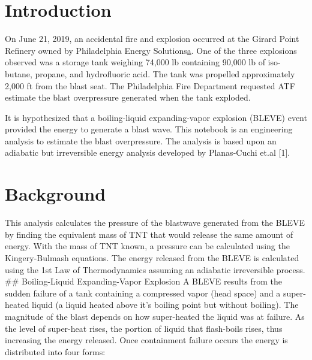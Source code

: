 \documentclass[10pt,parskip=half,
toc=sectionentrywithdots,
bibliography=totocnumbered,
captions=tableheading,numbers=noendperiod]{scrartcl}
\begin{document}
    \begingroup
    \let\cleardoublepage\relax
    \let\clearpage\relax\tableofcontents\listoffigures\listoftables{}
    \endgroup

\hypertarget{introduction}{%
\section{Introduction}\label{introduction}}

On June 21, 2019, an accidental fire and explosion occurred at the
Girard Point Refinery owned by Philadelphia Energy
Solutions\href{https://6abc.com/hydrocarbon-vapors-identified-as-cause-of-philly-refinery-fire/5368469/}{a}.
One of the three explosions observed was a storage tank weighing 74,000
lb containing 90,000 lb of iso-butane, propane, and hydrofluoric acid.
The tank was propelled approximately 2,000 ft from the blast seat. The
Philadelphia Fire Department requested ATF estimate the blast
overpressure generated when the tank exploded.

It is hypothesized that a boiling-liquid expanding-vapor explosion
(BLEVE) event provided the energy to generate a blast wave. This
notebook is an engineering analysis to estimate the blast overpressure.
The analysis is based upon an adiabatic but irreversible energy analysis
developed by Planas-Cuchi et.al {[}1{]}.

\hypertarget{background}{%
\section{Background}\label{background}}

This analysis calculates the pressure of the blastwave generated from
the BLEVE by finding the equivalent mass of TNT that would release the
same amount of energy. With the mass of TNT known, a pressure can be
calculated using the Kingery-Bulmash equations. The energy released from
the BLEVE is calculated using the 1st Law of Thermodynamics assuming an
adiabatic irreversible process.\\
\#\# Boiling-Liquid Expanding-Vapor Explosion A BLEVE results from the
sudden failure of a tank containing a compressed vapor (head space) and
a super-heated liquid (a liquid heated above it's boiling point but
without boiling). The magnitude of the blast depends on how super-heated
the liquid was at failure. As the level of super-heat rises, the portion
of liquid that flash-boils rises, thus increasing the energy released.
Once containment failure occurs the energy is distributed into four
forms:
\end{document}
